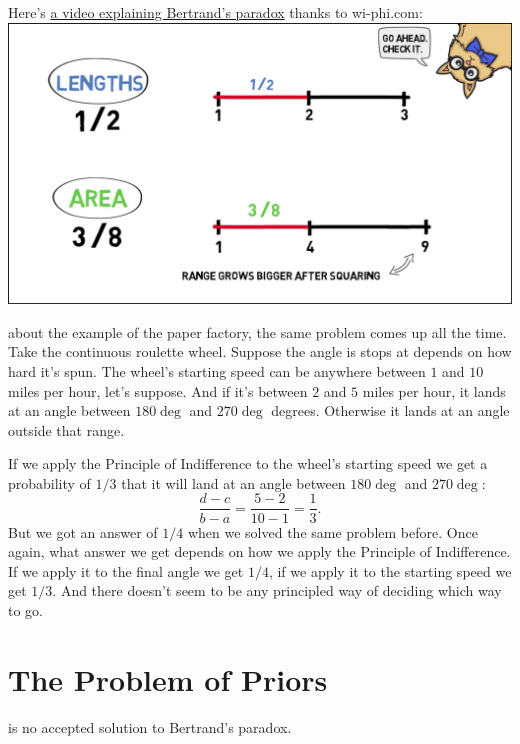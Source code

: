 \documentclass[justified]{tufte-book}
\theoremstyle{definition}
\theoremstyle{definition}
\theoremstyle{definition}
\theoremstyle{remark}
\begin{document}
\begin{marginfigure}
Here's \href{http://www.wi-phi.com/video/bertrands-paradox}{a video
explaining Bertrand's paradox} thanks to wi-phi.com:
\href{http://www.wi-phi.com/video/bertrands-paradox}{\includegraphics{img/bertrand_screengrab.png}}
\end{marginfigure}

 about the example of the paper
factory, the same problem comes up all the time. Take the continuous
roulette wheel. Suppose the angle is stops at depends on how hard it's
spun. The wheel's starting speed can be anywhere between \(1\) and
\(10\) miles per hour, let's suppose. And if it's between \(2\) and
\(5\) miles per hour, it lands at an angle between \(180\deg\) and
\(270\deg\) degrees. Otherwise it lands at an angle outside that range.

If we apply the Principle of Indifference to the wheel's starting speed
we get a probability of \(1/3\) that it will land at an angle between
\(180\deg\) and \(270\deg\):
\[ \frac{d-c}{b-a} = \frac{5-2}{10-1} = \frac{1}{3}. \] But we got an
answer of \(1/4\) when we solved the same problem before. Once again,
what answer we get depends on how we apply the Principle of
Indifference. If we apply it to the final angle we get \(1/4\), if we
apply it to the starting speed we get \(1/3\). And there doesn't seem to
be any principled way of deciding which way to go.

\hypertarget{the-problem-of-priors}{%
\section{The Problem of Priors}\label{the-problem-of-priors}}

 is no accepted solution to Bertrand's paradox.
\end{document}
